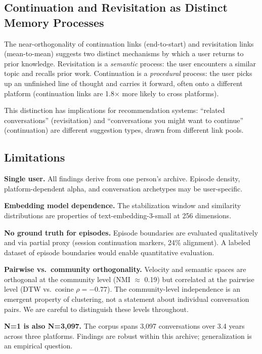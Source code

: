 \documentclass[11pt]{article}
\begin{document}
\subsection{Continuation and Revisitation as Distinct Memory Processes}

The near-orthogonality of continuation links (end-to-start) and revisitation links (mean-to-mean) suggests two distinct mechanisms by which a user returns to prior knowledge. Revisitation is a \emph{semantic} process: the user encounters a similar topic and recalls prior work. Continuation is a \emph{procedural} process: the user picks up an unfinished line of thought and carries it forward, often onto a different platform (continuation links are 1.8$\times$ more likely to cross platforms).

This distinction has implications for recommendation systems: ``related conversations'' (revisitation) and ``conversations you might want to continue'' (continuation) are different suggestion types, drawn from different link pools.

\subsection{Limitations}

\textbf{Single user.} All findings derive from one person's archive. Episode density, platform-dependent alpha, and conversation archetypes may be user-specific.

\textbf{Embedding model dependence.} The stabilization window and similarity distributions are properties of text-embedding-3-small at 256 dimensions.

\textbf{No ground truth for episodes.} Episode boundaries are evaluated qualitatively and via partial proxy (session continuation markers, 24\% alignment). A labeled dataset of episode boundaries would enable quantitative evaluation.

\textbf{Pairwise vs.\ community orthogonality.} Velocity and semantic spaces are orthogonal at the community level (NMI $\approx$ 0.19) but correlated at the pairwise level (DTW vs.\ cosine $\rho = -0.77$). The community-level independence is an emergent property of clustering, not a statement about individual conversation pairs. We are careful to distinguish these levels throughout.

\textbf{N=1 is also N=3,097.} The corpus spans 3,097 conversations over 3.4 years across three platforms. Findings are robust within this archive; generalization is an empirical question.
\end{document}
